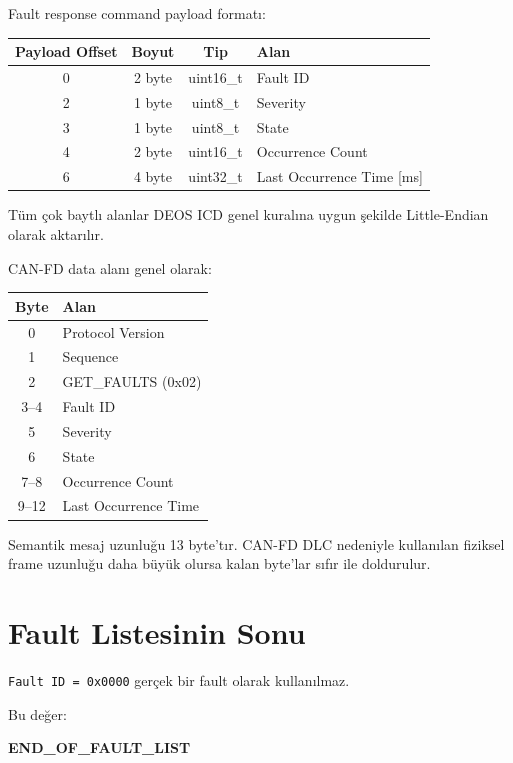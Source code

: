 \documentclass[a4paper,11pt]{article}
\begin{document}
Fault response command payload formatı:

\begin{center}
\begin{tabular}{c c c l}
\toprule
\textbf{Payload Offset} &
\textbf{Boyut} &
\textbf{Tip} &
\textbf{Alan} \\
\midrule
0 & 2 byte & uint16\_t & Fault ID \\
2 & 1 byte & uint8\_t  & Severity \\
3 & 1 byte & uint8\_t  & State \\
4 & 2 byte & uint16\_t & Occurrence Count \\
6 & 4 byte & uint32\_t & Last Occurrence Time [ms] \\
\bottomrule
\end{tabular}
\end{center}

Tüm çok baytlı alanlar DEOS ICD genel kuralına uygun şekilde
Little-Endian olarak aktarılır.

CAN-FD data alanı genel olarak:

\begin{center}
\begin{tabular}{c l}
\toprule
\textbf{Byte} & \textbf{Alan} \\
\midrule
0 & Protocol Version \\
1 & Sequence \\
2 & GET\_FAULTS (0x02) \\
3--4 & Fault ID \\
5 & Severity \\
6 & State \\
7--8 & Occurrence Count \\
9--12 & Last Occurrence Time \\
\bottomrule
\end{tabular}
\end{center}

Semantik mesaj uzunluğu 13 byte'tır.
CAN-FD DLC nedeniyle kullanılan fiziksel frame uzunluğu daha büyük
olursa kalan byte'lar sıfır ile doldurulur.

\section{Fault Listesinin Sonu}

\texttt{Fault ID = 0x0000} gerçek bir fault olarak kullanılmaz.

Bu değer:

\begin{center}
\textbf{END\_OF\_FAULT\_LIST}
\end{center}
\end{document}
